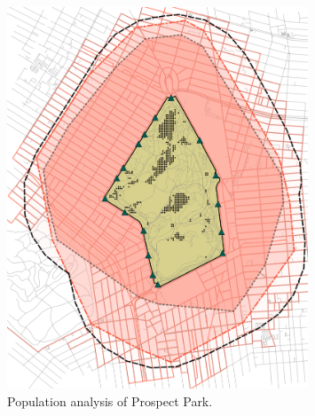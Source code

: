 \begin{figure}[ht]
  \centering
  \captionsetup{width=0.8\textwidth}
  \includegraphics[width=0.8\textwidth]{images/network/prospect_approx_pop.png}\par
  \caption[Prospect Park - population]{Population analysis of Prospect Park.}
  \label{fig:prospect_1km_pop}
\end{figure}

